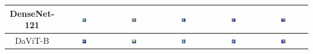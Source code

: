 \begin{table}
\begin{tabular}{|c|c|c|c|c|c|}
        DenseNet-121 & \includegraphics[width=0.15\textwidth]{figs/gradcams/gradcam_densenet121_kl0.png} & \includegraphics[width=0.15\textwidth]{figs/gradcams/gradcam_densenet121_kl1.png} & \includegraphics[width=0.15\textwidth]{figs/gradcams/gradcam_densenet121_kl2.png} & \includegraphics[width=0.15\textwidth]{figs/gradcams/gradcam_densenet121_kl3.png} & \includegraphics[width=0.15\textwidth]{figs/gradcams/gradcam_densenet121_kl4.png} \\ \hline
        DaViT-B & \includegraphics[width=0.15\textwidth]{figs/gradcams/gradcam_davit_kl0.png} & \includegraphics[width=0.15\textwidth]{figs/gradcams/gradcam_davit_kl1.png} & \includegraphics[width=0.15\textwidth]{figs/gradcams/gradcam_davit_kl2.png} & \includegraphics[width=0.15\textwidth]{figs/gradcams/gradcam_davit_kl3.png} & \includegraphics[width=0.15\textwidth]{figs/gradcams/gradcam_davit_kl4.png} \\ \hline

\end{tabular}
\end{table}
